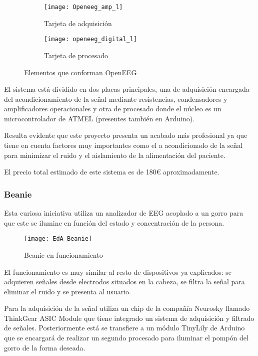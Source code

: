 \begin{figure}[h]
  \centering
  \begin{subfigure}[b]{6.5cm}
   	\centering
    \texttt{[image: Openeeg\_amp\_l]}
    \caption{Tarjeta de adquisición}
    \label{fig:Openeeg_amp_l}
  \end{subfigure}
  \begin{subfigure}[b]{6.5cm}
  	\centering
    \texttt{[image: openeeg\_digital\_l]}
    \caption{Tarjeta de procesado}
    \label{fig:openeeg_digital_l}
  \end{subfigure}
  \caption{Elementos que conforman OpenEEG \cite{OpenEEG}}
  \label{fig:OpenEEG}
\end{figure}

El sistema está dividido en dos placas principales, una de adquisición encargada del acondicionamiento de la señal mediante resistencias, condensadores y amplificadores operacionales y otra de procesado donde el núcleo es un microcontrolador de ATMEL (presentes también en Arduino). 

Resulta evidente que este proyecto presenta un acabado más profesional ya que tiene en cuenta factores muy importantes como el a acondicionado de la señal para minimizar el ruido y el aislamiento de la alimentación del paciente.

El precio total estimado de este sistema es de 180€ aproximadamente.

\subsubsection{Beanie}

Esta curiosa iniciativa utiliza un analizador de EEG acoplado a un gorro para que este se ilumine en función del estado y concentración de la persona.

\begin{figure} [h]
    \centering
    \texttt{[image: EdA\_Beanie]}
    \caption{Beanie en funcionamiento \cite{beanie}}
    \label{fig:EdA_Beanie}
\end{figure}

El funcionamiento es muy similar al resto de dispositivos ya explicados: se adquieren señales desde electrodos situados en la cabeza, se filtra la señal para eliminar el ruido y se presenta al usuario.

Para la adquisición de la señal utiliza un chip de la compañía Neurosky llamado ThinkGear ASIC Module que tiene integrado un sistema de adquisición y filtrado de señales. Posteriormente está se transfiere a un módulo TinyLily de Arduino que se encargará de realizar un segundo procesado para iluminar el pompón del gorro de la forma deseada.

